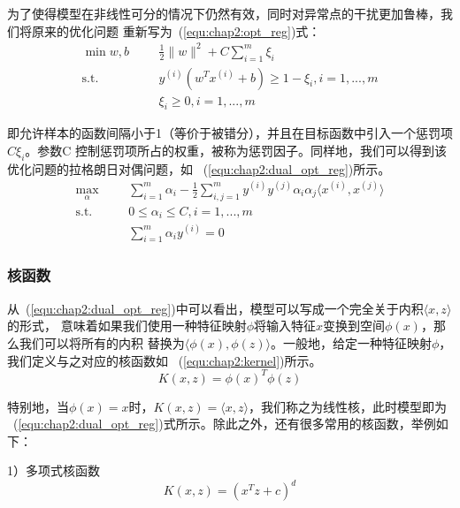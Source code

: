 为了使得模型在非线性可分的情况下仍然有效，同时对异常点的干扰更加鲁棒，我们将原来的优化问题
重新写为~(\ref{equ:chap2:opt_reg})式：
\begin{equation}
  \label{equ:chap2:opt_reg}
  \begin{aligned}
    \min{w,b} &
    & & \frac{1}{2}\|w\|^2+C\sum_{i=1}^m\xi_i \\
    \text{s.t.} &
    & & y^{(i)}\left(w^Tx^{(i)}+b\right)\geq 1-\xi_i, i=1,...,m \\
    \quad &
    & & \xi_i \geq 0, i=1,...,m
  \end{aligned}
\end{equation}

即允许样本的函数间隔小于1（等价于被错分），并且在目标函数中引入一个惩罚项$C\xi_i$。参数C
控制惩罚项所占的权重，被称为惩罚因子。同样地，我们可以得到该优化问题的拉格朗日对偶问题，如
~(\ref{equ:chap2:dual_opt_reg})所示。
\begin{equation}
  \label{equ:chap2:dual_opt_reg}
  \begin{aligned}
    \max_{\alpha} &
    & & \sum_{i=1}^m\alpha_i-\frac{1}{2}\sum_{i,j=1}^m
    y^{(i)}y^{(j)}\alpha_i\alpha_j\langle x^{(i)},x^{(j)}\rangle\\
    \text{s.t.} &
    & & 0\leq\alpha_i\leq C, i=1,...,m \\
    \quad &
    & & \sum_{i=1}^m\alpha_iy^{(i)}=0
  \end{aligned}
\end{equation}

\subsubsection{核函数}

从~(\ref{equ:chap2:dual_opt_reg})中可以看出，模型可以写成一个完全关于内积$\langle x,z\rangle$的形式，
意味着如果我们使用一种特征映射$\phi$将输入特征$x$变换到空间$\phi(x)$，那么我们可以将所有的内积
替换为$\langle\phi(x),\phi(z)\rangle$。一般地，给定一种特征映射$\phi$，我们定义与之对应的核函数如
~(\ref{equ:chap2:kernel})所示。
\begin{equation}
  \label{equ:chap2:kernel}
  K(x,z)=\phi(x)^T\phi(z)
\end{equation}

特别地，当$\phi(x)=x$时，$K(x,z)=\langle x,z\rangle$，我们称之为线性核，此时模型即为
~(\ref{equ:chap2:dual_opt_reg})式所示。除此之外，还有很多常用的核函数，举例如下：

1）多项式核函数
\begin{equation}
  \label{equ:chap2:polynomial_kernel}
  K(x,z)=(x^Tz+c)^d
\end{equation}

